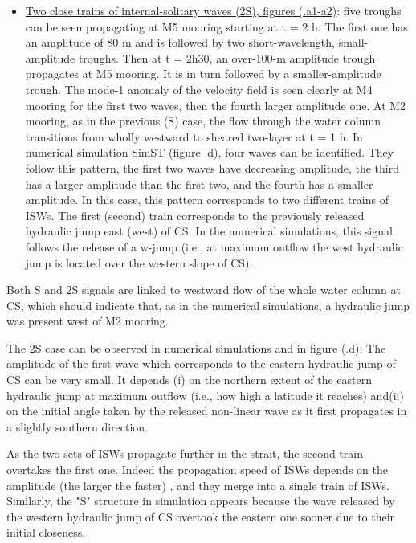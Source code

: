 \begin{itemize}
%
\item \underline{Two close trains of internal-solitary waves (2S), figures (.a1-a2)}: five troughs can be seen propagating at M5 mooring starting at t = 2 h. The first one has an amplitude of 80 m and is followed by two short-wavelength, small-amplitude troughs. Then at t = 2h30, an over-100-m amplitude trough propagates at M5 mooring. It is in turn followed by a smaller-amplitude trough. The mode-1 anomaly of the velocity field is seen clearly at M4 mooring for the first two waves, then the fourth larger amplitude one. At M2 mooring, as in the previous (S) case, the flow through the water column transitions from wholly westward to sheared two-layer at t = 1 h. In numerical simulation SimST (figure .d), four waves can be identified. They follow this pattern, \color{blue} the first two waves have decreasing amplitude, the third has a larger amplitude than the first two, and the fourth has a smaller amplitude. \color{black} In this case, this pattern corresponds to two different trains of ISWs.  \color{blue}The first (second) train corresponds to the previously  released hydraulic jump east (west) of CS.\color{black} In the numerical simulations, this signal follows the release of a w-jump (i.e., at maximum outflow the west hydraulic jump is located over the western slope of CS).
\end{itemize}

Both S and 2S signals are linked to westward flow of the whole water column at CS, which should indicate that, as in the numerical simulations, a hydraulic jump was present west of M2 mooring.

\color{blue}The 2S case can be observed in numerical simulations and in figure (.d). \color{black} The amplitude of the first wave which corresponds to the eastern hydraulic jump of CS can be very small. It depends (i) on the northern extent of the eastern hydraulic jump at maximum outflow (i.e., how high a latitude it reaches) and(ii) on the initial angle taken by the released non-linear wave as it first propagates in a slightly southern direction.

As the two sets of ISWs propagate further in the strait, the second train overtakes the first one. Indeed the propagation speed of ISWs depends on the amplitude \color{blue} (the larger the faster) \color{black}, and they merge into a single train of ISWs. Similarly, the "S" structure in simulation appears because the wave released by the western hydraulic jump of CS overtook the eastern one sooner due to their initial closeness.

